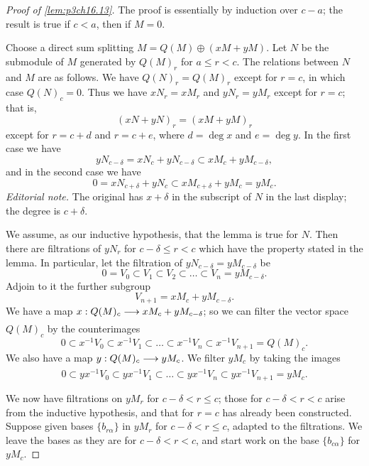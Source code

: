\documentclass[../main]{subfiles}
\begin{document}
\begin{proof}[Proof of \ref{lem:p3ch16.13}]
The proof is essentially by induction over $c - a$; the result is true if $c < a$, then if $M = 0$.

Choose a direct sum splitting $M=Q(M)\oplus(xM+yM)$. Let $N$ be the submodule of $M$ generated by $Q(M)_r$ for $a\le r<c$. The relations between $N$ and $M$ are as follows. We have $Q(N)_r=Q(M)_r$ except for $r=c$, in which case $Q(N)_c=0$. Thus we have $xN_r=xM_r$ and $yN_r=yM_r$ except for $r=c$; that is, \[(xN+yN)_r=(xM+yM)_r\] except for $r=c+d$ and $r=c+e$, where $d=\deg x$ and $e=\deg y$. In the first case we have \[yN_{c-\delta}=xN_c+yN_{c-\delta}\subset xM_c+yM_{c-\delta},\] and in the second case we have \[0=xN_{c+\delta}+yN_c\subset xM_{c+\delta}+yM_c=yM_c.\]
\noindent\textit{Editorial note.} The original has $x+\delta$ in the subscript of $N$ in the last display; the degree is $c+\delta$.

We assume, as our inductive hypothesis, that the lemma is true for $N$. Then there are filtrations of $yN_r$ for $c-\delta\le r<c$ which have the property stated in the lemma. In particular, let the filtration of $yN_{c-\delta}=yM_{c-\delta}$ be
\[0=V_0\subset V_1\subset V_2\subset\ldots\subset V_n=yM_{c-\delta}.\]
Adjoin to it the further subgroup
\[V_{n+1}=xM_c+yM_{c-\delta}.\]
We have a map $x:Q(M)_c\lar{}xM_c+yM_{c-\delta}$; so we can filter the vector space $Q(M)_c$ by the counterimages
\[0\subset x^{-1}V_0\subset x^{-1}V_1\subset\ldots\subset x^{-1}V_n\subset x^{-1}V_{n+1}=Q(M)_c.\]
We also have a map $y:Q(M)_c\lar{}yM_c$. We filter $yM_c$ by taking the images
\[0\subset yx^{-1}V_0\subset yx^{-1}V_1\subset\ldots\subset yx^{-1}V_n\subset yx^{-1}V_{n+1}=yM_c.\]

We now have filtrations on $y M_r$ for $c - \delta < r \le c$; those for $c - \delta < r < c$ arise from the inductive hypothesis, and that for $r = c$ has already been constructed. Suppose given bases $\{b_{r \alpha}\}$ in $y M_r$ for $c - \delta < r \le c$, adapted to the filtrations. We leave the bases as they are for $c - \delta < r < c$, and start work on the base $\{b_{c \alpha}\}$ for $y M_c$. 


\end{proof}
\end{document}
